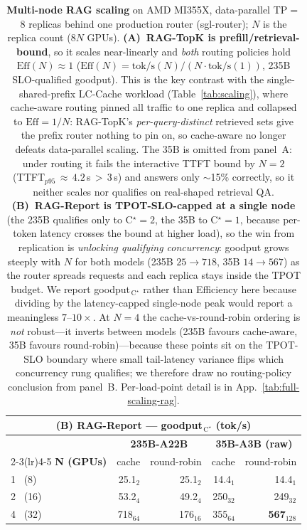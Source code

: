 \begin{table}[t]
  \medskip
  \begin{tabular}{@{}l r r r r@{}}
    \multicolumn{5}{c}{\textbf{(B) RAG-Report} --- goodput$_{\,\text{C}^\star}$ (tok/s)} \\
    \toprule
    & \multicolumn{2}{c}{\textbf{235B-A22B}} & \multicolumn{2}{c}{\textbf{35B-A3B (raw)}} \\
    \cmidrule(lr){2-3}\cmidrule(lr){4-5}
    \textbf{N (GPUs)} & cache & round-robin & cache & round-robin \\
    \midrule
    1 \ (8)   & 25.1$_{2}$  & 25.1$_{2}$  & 14.4$_{1}$  & 14.4$_{1}$ \\
    2 \ (16)  & 53.2$_{4}$  & 49.2$_{4}$  & 250$_{32}$  & 249$_{32}$ \\
    4 \ (32)  & 718$_{64}$  & 176$_{16}$  & 355$_{64}$  & \textbf{567}$_{128}$ \\
    \bottomrule
  \end{tabular}
  \caption{\textbf{Multi-node RAG scaling} on AMD MI355X, data-parallel TP$=$8
  replicas behind one production router (sgl-router); $N$ is the replica count
  ($8N$ GPUs). \textbf{(A)~RAG-TopK is prefill/retrieval-bound}, so it scales
  near-linearly and \emph{both} routing policies hold $\text{Eff}(N)\!\approx\!1$
  ($\text{Eff}(N)=\text{tok/s}(N)/(N\cdot\text{tok/s}(1))$, 235B SLO-qualified
  goodput). This is the key contrast with the single-shared-prefix LC-Cache
  workload (Table~\ref{tab:scaling}), where cache-aware routing pinned all traffic
  to one replica and collapsed to $\text{Eff}{=}1/N$: RAG-TopK's
  \emph{per-query-distinct} retrieved sets give the prefix router nothing to pin on,
  so cache-aware no longer defeats data-parallel scaling. The 35B is omitted from
  panel~A: under routing it fails the interactive TTFT bound by $N{=}2$
  (TTFT$_{p95}\,{\approx}\,4.2$\,s\,$>$\,3\,s) and answers only $\sim$15\%
  correctly, so it neither scales nor qualifies on real-shaped retrieval QA.
  \textbf{(B)~RAG-Report is TPOT-SLO-capped at a single node} (the 235B qualifies
  only to C$^\star{=}2$, the 35B to C$^\star{=}1$, because per-token latency
  crosses the bound at higher load), so the win from replication is
  \emph{unlocking qualifying concurrency}: goodput grows steeply with $N$ for both
  models (235B $25\!\to\!718$, 35B $14\!\to\!567$) as the router spreads requests
  and each replica stays inside the TPOT budget. We report goodput$_{\,\text{C}^\star}$
  rather than Efficiency here because dividing by the latency-capped single-node
  peak would report a meaningless $7\text{--}10\times$. At $N{=}4$ the cache-vs-round-robin
  ordering is \emph{not} robust---it inverts between models (235B favours
  cache-aware, 35B favours round-robin)---because these points sit on the TPOT-SLO
  boundary where small tail-latency variance flips which concurrency rung
  qualifies; we therefore draw no routing-policy conclusion from panel~B.
  Per-load-point detail is in App.~\ref{tab:full-scaling-rag}.}
  \label{tab:scaling-rag}
\end{table}